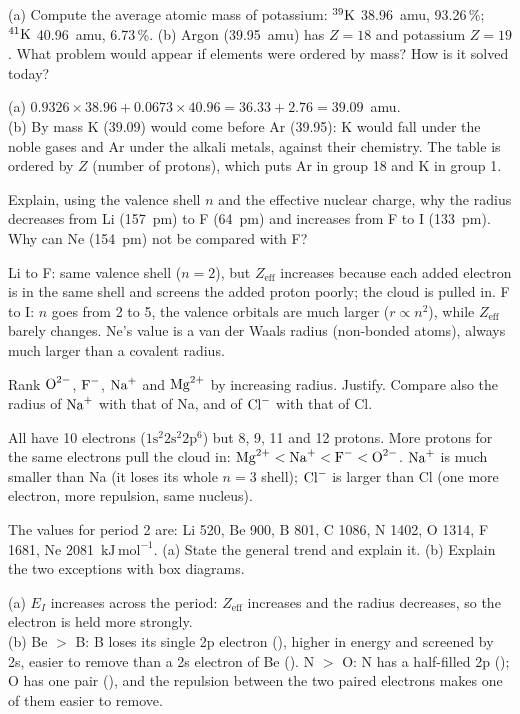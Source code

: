 (a) Compute the average atomic mass of potassium: ${}^{39}\mathrm{K}$ 38.96~amu, 93.26\,\%;
${}^{41}\mathrm{K}$ 40.96~amu, 6.73\,\%. (b) Argon (39.95~amu) has $Z = 18$ and potassium $Z = 19$. What problem
would appear if elements were ordered by mass? How is it solved today?
\begin{solution}
(a) $0.9326\times38.96 + 0.0673\times40.96 = 36.33 + 2.76 = 39.09$~amu.\\
(b) By mass K (39.09) would come before Ar (39.95): K would fall under the noble gases and Ar under the
alkali metals, against their chemistry. The table is ordered by $Z$ (number of protons), which puts
Ar in group 18 and K in group 1.
\end{solution}

Explain, using the valence shell $n$ and the effective nuclear charge, why the radius decreases from
Li (157~pm) to F (64~pm) and increases from F to I (133~pm). Why can Ne (154~pm) not be compared with F?
\begin{solution}
Li to F: same valence shell ($n = 2$), but $Z_\mathrm{eff}$ increases because each added electron is in the
same shell and screens the added proton poorly; the cloud is pulled in. F to I: $n$ goes from 2 to 5,
the valence orbitals are much larger ($r\propto n^2$), while $Z_\mathrm{eff}$ barely changes. Ne's value
is a van der Waals radius (non-bonded atoms), always much larger than a covalent radius.
\end{solution}

Rank $\ce{O^2-}$, $\ce{F-}$, $\ce{Na+}$ and $\ce{Mg^2+}$ by increasing radius. Justify. Compare also the
radius of $\ce{Na+}$ with that of Na, and of $\ce{Cl-}$ with that of Cl.
\begin{solution}
All have 10 electrons ($1\mathrm s^2 2\mathrm s^2 2\mathrm p^6$) but 8, 9, 11 and 12 protons. More protons for
the same electrons pull the cloud in: $\ce{Mg^2+} < \ce{Na+} < \ce{F-} < \ce{O^2-}$.
$\ce{Na+}$ is much smaller than Na (it loses its whole $n = 3$ shell); $\ce{Cl-}$ is larger than Cl (one more
electron, more repulsion, same nucleus).
\end{solution}

The values for period 2 are: Li 520, Be 900, B 801, C 1086, N 1402, O 1314, F 1681,
Ne 2081~$\mathrm{kJ\,mol^{-1}}$. (a) State the general trend and explain it. (b) Explain the two
exceptions with box diagrams.
\begin{solution}
(a) $E_I$ increases across the period: $Z_\mathrm{eff}$ increases and the radius decreases, so the
electron is held more strongly.\\
(b) Be $>$ B: B loses its single 2p electron (\;), higher in energy and screened by
2s, easier to remove than a 2s electron of Be (\;).
N $>$ O: N has a half-filled 2p (); O has one pair (), and the repulsion
between the two paired electrons makes one of them easier to remove.
\end{solution}

